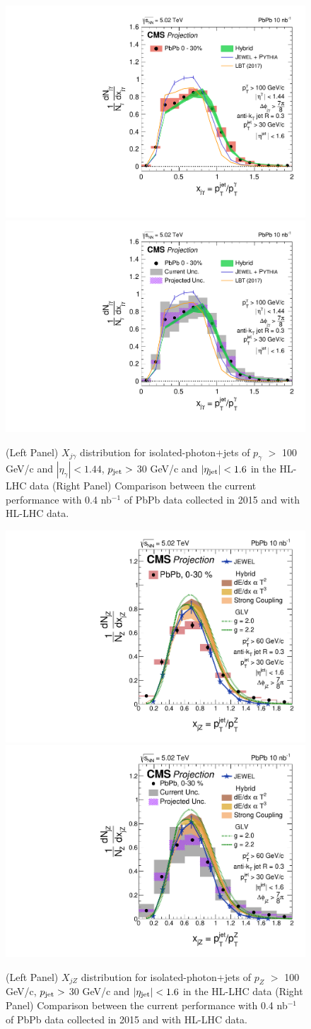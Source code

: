 \begin{figure}[!ht]
\begin{center}
\includegraphics[width=.45\textwidth]{figures/cms/xjg_projection_2.pdf}
\includegraphics[width=.45\textwidth]{figures/cms/xjg_projection.pdf}
\caption{(Left Panel) $X_{j\gamma}$ distribution for isolated-photon+jets of $p_{\gamma}$ $> $ 100 GeV/c and $|\eta_{\gamma}|<1.44$, $p_{\rm jet} > $ 30 GeV/c and $|\eta_{\rm jet}| < 1.6$ in the HL-LHC data (Right Panel) Comparison between the current performance with 0.4 nb$^{-1}$ of PbPb data collected in 2015 and with HL-LHC data. \cite{CMS-FTR-17-002:2017dec}}
\label{fig:photonjet}
\end{center}
\end{figure}

\begin{figure}[!ht]
\begin{center}
\includegraphics[width=.45\textwidth]{figures/cms/projection_xjz_Theory_sysReduced50Prct.pdf}
\includegraphics[width=.45\textwidth]{figures/cms/projection_xjz_Theory_MergedUnc_sysReduced50Prct.pdf}
\caption{(Left Panel) $X_{jZ}$ distribution for isolated-photon+jets of $p_{Z}$ $> $ 100 GeV/c, $p_{\rm jet} > $ 30 GeV/c and $|\eta_{\rm jet}| < 1.6$ in the HL-LHC data (Right Panel) Comparison between the current performance with 0.4 nb$^{-1}$ of PbPb data collected in 2015 and with HL-LHC data. \cite{CMS-FTR-17-002:2017dec}}
\label{fig:Zjet}
\end{center}
\end{figure}